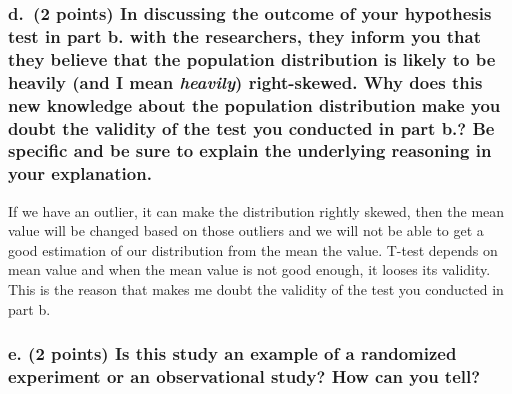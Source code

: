 \documentclass[
]{article}
\begin{document}
\hypertarget{d.-2-points-in-discussing-the-outcome-of-your-hypothesis-test-in-part-b.-with-the-researchers-they-inform-you-that-they-believe-that-the-population-distribution-is-likely-to-be-heavily-and-i-mean-heavily-right-skewed.-why-does-this-new-knowledge-about-the-population-distribution-make-you-doubt-the-validity-of-the-test-you-conducted-in-part-b.-be-specific-and-be-sure-to-explain-the-underlying-reasoning-in-your-explanation.}{%
\subsubsection{\texorpdfstring{d.~(2 points) In discussing the outcome
of your hypothesis test in part b. with the researchers, they inform you
that they believe that the population distribution is likely to be
heavily (and I mean \emph{heavily}) right-skewed. Why does this new
knowledge about the population distribution make you doubt the validity
of the test you conducted in part b.? Be specific and be sure to explain
the underlying reasoning in your
explanation.}{d.~(2 points) In discussing the outcome of your hypothesis test in part b. with the researchers, they inform you that they believe that the population distribution is likely to be heavily (and I mean heavily) right-skewed. Why does this new knowledge about the population distribution make you doubt the validity of the test you conducted in part b.? Be specific and be sure to explain the underlying reasoning in your explanation.}}\label{d.-2-points-in-discussing-the-outcome-of-your-hypothesis-test-in-part-b.-with-the-researchers-they-inform-you-that-they-believe-that-the-population-distribution-is-likely-to-be-heavily-and-i-mean-heavily-right-skewed.-why-does-this-new-knowledge-about-the-population-distribution-make-you-doubt-the-validity-of-the-test-you-conducted-in-part-b.-be-specific-and-be-sure-to-explain-the-underlying-reasoning-in-your-explanation.}}

If we have an outlier, it can make the distribution rightly skewed, then
the mean value will be changed based on those outliers and we will not
be able to get a good estimation of our distribution from the mean the
value. T-test depends on mean value and when the mean value is not good
enough, it looses its validity. This is the reason that makes me doubt
the validity of the test you conducted in part b.

\hypertarget{e.-2-points-is-this-study-an-example-of-a-randomized-experiment-or-an-observational-study-how-can-you-tell}{%
\subsubsection{e. (2 points) Is this study an example of a randomized
experiment or an observational study? How can you
tell?}\label{e.-2-points-is-this-study-an-example-of-a-randomized-experiment-or-an-observational-study-how-can-you-tell}}
\end{document}
